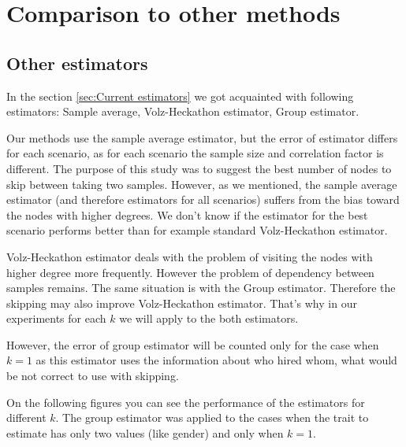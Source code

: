 \documentclass[12pt]{report}
\begin{document}
\chapter{Comparison to other methods}

\section{Other estimators}

In the section \ref{sec:Current estimators} we got acquainted with following estimators: Sample average, Volz-Heckathon estimator, Group estimator. 

Our methods use the sample average estimator, but the error of estimator differs for each scenario, as for each scenario the sample size and correlation factor is different. The purpose of this study was to suggest the best number of nodes to skip between taking two samples. However, as we  mentioned, the sample average estimator (and therefore estimators for all scenarios) suffers from the bias toward the nodes with higher degrees. We don't know if the estimator for the best scenario performs better than for example standard Volz-Heckathon estimator.  

Volz-Heckathon estimator deals with the problem of visiting the nodes with higher degree more frequently. However the problem of dependency between samples remains. The same situation is with the Group estimator.
Therefore the skipping may also improve Volz-Heckathon estimator. That's why in our experiments for each $k$ we will apply to the both estimators. 

However, the error of group estimator will be counted only for the case when $k = 1$ as this estimator uses the information about who hired whom, what would be not correct to use with skipping.


On the following figures you can see the performance of the estimators for different $k$. The group estimator was applied to the cases when the trait to estimate has only two values (like gender) and only when $k=1$.
\end{document}
